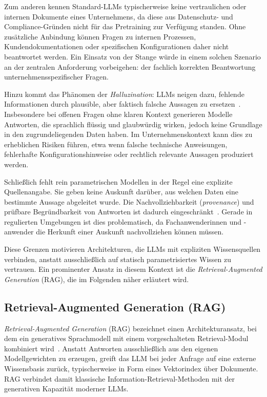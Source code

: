 Zum anderen kennen Standard-LLMs typischerweise keine vertraulichen oder internen Dokumente eines Unternehmens, da diese aus Datenschutz- und Compliance-Gründen nicht für das Pretraining zur Verfügung standen.
Ohne zusätzliche Anbindung können Fragen zu internen Prozessen, Kundendokumentationen oder spezifischen Konfigurationen daher nicht beantwortet werden.
Ein Einsatz \glqq von der Stange\grqq{} würde in einem solchen Szenario an der zentralen Anforderung vorbeigehen: der fachlich korrekten Beantwortung unternehmensspezifischer Fragen.

Hinzu kommt das Phänomen der \textit{Halluzination}:
LLMs neigen dazu, fehlende Informationen durch plausible, aber faktisch falsche Aussagen zu ersetzen~\cite{ji2023hallucination}.
Insbesondere bei offenen Fragen ohne klaren Kontext generieren Modelle Antworten, die sprachlich flüssig und glaubwürdig wirken, jedoch keine Grundlage in den zugrundeliegenden Daten haben.
Im Unternehmenskontext kann dies zu erheblichen Risiken führen, etwa wenn falsche technische Anweisungen, fehlerhafte Konfigurationshinweise oder rechtlich relevante Aussagen produziert werden.

Schließlich fehlt rein parametrischen Modellen in der Regel eine explizite Quellenangabe.
Sie geben keine Auskunft darüber, aus welchen Daten eine bestimmte Aussage abgeleitet wurde.
Die Nachvollziehbarkeit (\textit{provenance}) und prüfbare Begründbarkeit von Antworten ist dadurch eingeschränkt~\cite{lewis2020rag}.
Gerade in regulierten Umgebungen ist dies problematisch, da Fachanwenderinnen und -anwender die Herkunft einer Auskunft nachvollziehen können müssen.

Diese Grenzen motivieren Architekturen, die LLMs mit expliziten Wissensquellen verbinden, anstatt ausschließlich auf statisch parametrisiertes Wissen zu vertrauen.
Ein prominenter Ansatz in diesem Kontext ist die \textit{Retrieval-Augmented Generation} (RAG), die im Folgenden näher erläutert wird.

\subsection{Retrieval-Augmented Generation (RAG)}
\label{subsec:grundlagen-rag}

\textit{Retrieval-Augmented Generation} (RAG) bezeichnet einen Architekturansatz, bei dem ein generatives Sprachmodell mit einem vorgeschalteten Retrieval-Modul kombiniert wird~\cite{lewis2020rag,gao2023retrieval}.
Anstatt Antworten ausschließlich aus den eigenen Modellgewichten zu erzeugen, greift das LLM bei jeder Anfrage auf eine externe Wissensbasis zurück, typischerweise in Form eines Vektorindex über Dokumente.
RAG verbindet damit klassische Information-Retrieval-Methoden mit der generativen Kapazität moderner LLMs.

